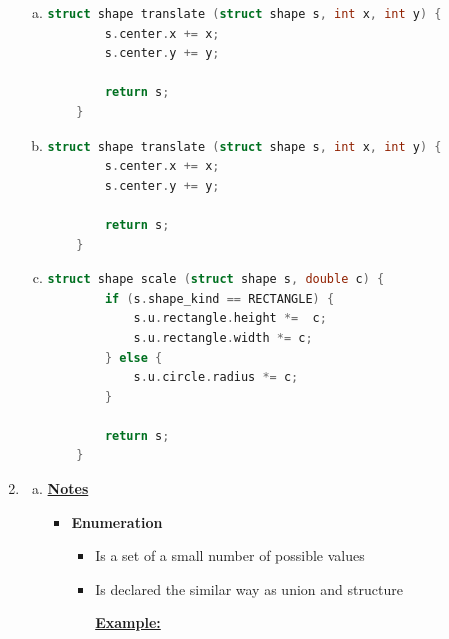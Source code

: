 \documentclass[12pt]{article}
\begin{document}
\begin{enumerate}[1.]
\begin{enumerate}[a)]
        \item

\begin{lstlisting}[language=c]
    struct shape translate (struct shape s, int x, int y) {
        s.center.x += x;
        s.center.y += y;

        return s;
    }
\end{lstlisting}

        \item

\begin{lstlisting}[language=c]
    struct shape translate (struct shape s, int x, int y) {
        s.center.x += x;
        s.center.y += y;

        return s;
    }
\end{lstlisting}

        \item

\begin{lstlisting}[language=c]
    struct shape scale (struct shape s, double c) {
        if (s.shape_kind == RECTANGLE) {
            s.u.rectangle.height *=  c;
            s.u.rectangle.width *= c;
        } else {
            s.u.circle.radius *= c;
        }

        return s;
    }
\end{lstlisting}

    \end{enumerate}

    \item

    \begin{enumerate}[a)]

        \item

        \bigskip

        \underline{\textbf{Notes}}

        \begin{itemize}
            \item \textbf{Enumeration}

            \begin{itemize}
                \item Is a set of a small number of possible values
                \item Is declared the similar way as union and structure

                \bigskip

                \underline{\textbf{Example:}}


\end{itemize}
\end{itemize}
\end{enumerate}
\end{enumerate}
\end{document}
